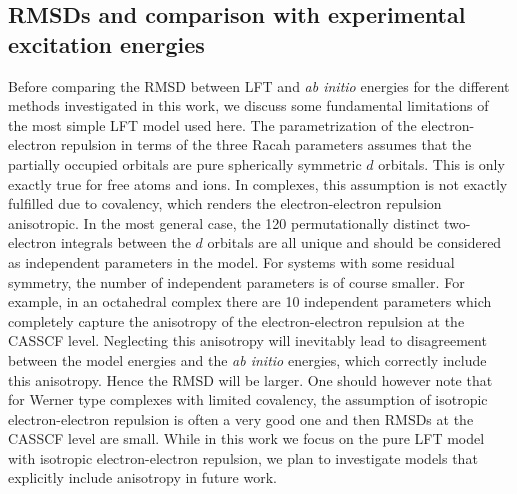 \subsection{RMSDs and comparison with experimental excitation energies}
Before comparing the RMSD between LFT and \textit{ab initio} energies for the different methods investigated in this work, we discuss some fundamental limitations of the most simple LFT model used here. The parametrization of the electron-electron repulsion in terms of the three Racah parameters assumes that the partially occupied orbitals are pure spherically symmetric $d$ orbitals. This is only exactly true for free atoms and ions. In complexes, this assumption is not exactly fulfilled due to covalency, which renders the electron-electron repulsion anisotropic. In the most general case, the 120 permutationally distinct two-electron integrals between the $d$ orbitals are all unique and should be considered as independent parameters in the model. For systems with some residual symmetry, the number of independent parameters is of course smaller. For example, in an octahedral complex there are 10 independent parameters which completely capture the anisotropy of the electron-electron repulsion at the CASSCF level.\cite{AtanaDR_2004_97}\cite{Griff_1971_}\cite{Daul_1994_867} Neglecting this anisotropy will inevitably lead to disagreement between the model energies and the \textit{ab initio} energies, which correctly include this anisotropy. Hence the RMSD will be larger. One should however note that for Werner type complexes with limited covalency, the assumption of isotropic electron-electron repulsion is often a very good one and then RMSDs at the CASSCF level are small. While in this work we focus on the pure LFT model with isotropic electron-electron repulsion, we plan to investigate models that explicitly include anisotropy in future work.

